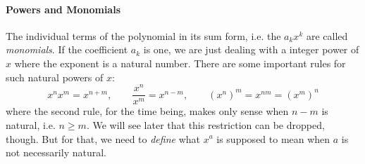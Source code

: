 



\paragraph{Powers and Monomials}
The individual terms of the polynomial in its sum form, i.e. the $a_k x^k$ are called \emph{monomials}. If the coefficient $a_k$ is one, we are just dealing with a integer power of $x$ where the exponent is a natural number. There are some important rules for such natural powers of $x$:
\begin{equation}
\label{Eq:PowerRulesNatural}
x^n x^m = x^{n+m}, \qquad
\frac{x^n}{x^m} = x^{n-m}, \qquad
(x^n)^m =  x^{n m} =  (x^m)^n
\end{equation}
where the second rule, for the time being, makes only sense when $n-m$ is natural, i.e. $n \geq m$. We will see later that this restriction can be dropped, though. But for that, we need to \emph{define} what $x^a$ is supposed to mean when $a$ is not necessarily natural.



